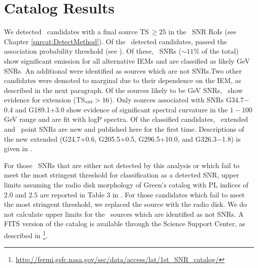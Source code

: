 
\section{Catalog Results}\label{snrcat:TheCatalog}
We detected \ndetected~candidates with a final source TS\,$\geq 25$ in the \nGalSNRs~SNR RoIs (see Chapter \ref{snrcat:DetectMethod}). Of the \ndetected~detected candidates, \nassocprobclassified{} passed the association probability threshold (see \cite{snrCat}). Of these, \nclassifiedsnrs~SNRs ($\sim11\%$ of the total) show significant emission for all alternative IEMs and are classified as likely GeV SNRs. An additional \nnotsnrs{} were identified as sources which are not SNRs.Two other candidates were demoted to marginal due to their dependence on the IEM, as described in the next paragraph. Of the sources likely to be GeV SNRs, \nextended~show evidence for extension (TS${\rm_{ext} > 16}$). Only sources associated with SNRs G34.7$-$0.4 and G189.1+3.0 show evidence of significant spectral curvature in the $1-100$\,GeV range and are fit with logP spectra. Of the classified candidates, \nnewextended~extended and \nnewpointlike~point SNRs are new and published here for the first time. Descriptions of the new extended (G24.7+0.6, G205.5+0.5, G296.5+10.0, and G326.3$-$1.8) \snrs{} is given in \cite{snrCat}.

For those \nULs~SNRs that are either not detected by this analysis or which fail to meet the most stringent threshold for classification as a detected SNR, upper limits assuming the radio disk morphology of Green's catalog with PL indices of $2.0$ and $2.5$ are reported in Table 3 in \cite{snrCat}. For those candidates which fail to meet the most stringent threshold, we replaced the source with the radio disk. We do not calculate upper limits for the \nnotsnrs~sources which are identified as not SNRs. A FITS version of the catalog is available through the \Fermi{} Science Support Center, as described in \cite{snrCat}\footnote{\url{ http://fermi.gsfc.nasa.gov/ssc/data/access/lat/1st_SNR_catalog/}}. 



